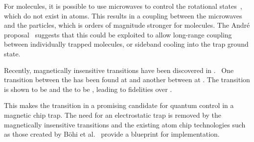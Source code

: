 For molecules, it is possible to use microwaves to control the rotational
states~\cite{}, which do not exist in atoms. This results in a coupling between
the microwaves and the particles, which is orders of magnitude stronger for
molecules. The Andr\'e proposal~\cite{Andre2006} suggests that this could be
exploited to allow long-range coupling between individually trapped molecules,
or sideband cooling into the trap ground state.

Recently, magnetically insensitive transitions have been discovered in
.~\cite{PhysRevLett.120.163201, Blackmore_2018, }  One transition between the  has been found at  and another between 
at . The  transition is shown to be 
and the  to be , leading to fidelities over
.

This makes the  transition in  a promising candidate for
quantum control in a magnetic chip trap. The need for an electrostatic trap is
removed by the magnetically insensitive transitions and the existing atom chip
technologies such as those created by B\"ohi et al.~\cite{Boehi2009} provide a
blueprint for implementation.
